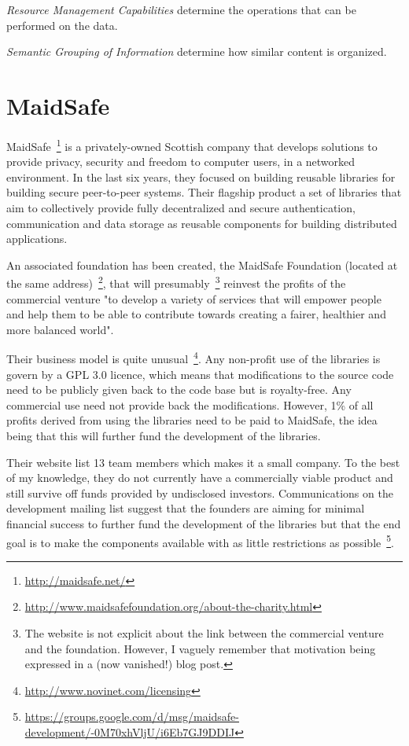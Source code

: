 \textit{Resource Management Capabilities} determine the operations that can be performed on the data.

\textit{Semantic Grouping of Information} determine how similar content is organized.


\section{MaidSafe}

MaidSafe~\footnote{\url{http://maidsafe.net/}} is a privately-owned Scottish company that develops solutions to provide privacy, security and freedom to computer users, in a networked environment. In the last six years, they focused on building reusable libraries for building secure peer-to-peer systems. Their flagship product a set of libraries that aim to collectively provide fully decentralized and secure authentication, communication and data storage as reusable components for building distributed applications.

An associated foundation has been created, the MaidSafe Foundation (located at the same address)~\footnote{\url{http://www.maidsafefoundation.org/about-the-charity.html}}, that will presumably~\footnote{The website is not explicit about the link between the commercial venture and the foundation. However, I vaguely remember that motivation being expressed in a (now vanished!) blog post.} reinvest the profits of the commercial venture "to develop a variety of services that will empower people and help them to be able to contribute towards creating a fairer, healthier and more balanced world".

Their business model is quite unusual~\footnote{\url{http://www.novinet.com/licensing}}. Any non-profit use of the libraries is govern by a GPL 3.0 licence, which means that modifications to the source code need to be publicly given back to the code base but is royalty-free. Any commercial use need not provide back the modifications. However, 1\% of all profits derived from using the libraries need to be paid to MaidSafe, the idea being that this will further fund the development of the libraries.

Their website list 13 team members which makes it a small company. To the best of my knowledge, they do not currently have a commercially viable product and still survive off funds provided by undisclosed investors. Communications on the development mailing list suggest that the founders are aiming for minimal financial success to further fund the development of the libraries but that the end goal is to make the components available with as little restrictions as possible~\footnote{\url{https://groups.google.com/d/msg/maidsafe-development/-0M70xhVljU/i6Eb7GJ9DDIJ}}.

